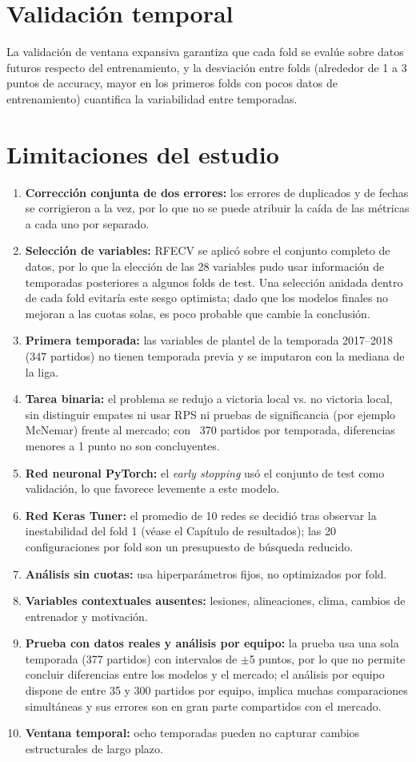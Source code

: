 \documentclass[12pt,letterpaper,oneside]{report}
\begin{document}
\section{Validación temporal}
La validación de ventana expansiva garantiza que cada fold se evalúe sobre datos futuros respecto del entrenamiento, y la desviación entre folds (alrededor de 1 a 3 puntos de accuracy, mayor en los primeros folds con pocos datos de entrenamiento) cuantifica la variabilidad entre temporadas.

\section{Limitaciones del estudio}
\begin{enumerate}
\item \textbf{Corrección conjunta de dos errores:} los errores de duplicados y de fechas se corrigieron a la vez, por lo que no se puede atribuir la caída de las métricas a cada uno por separado.
\item \textbf{Selección de variables:} RFECV se aplicó sobre el conjunto completo de datos, por lo que la elección de las 28 variables pudo usar información de temporadas posteriores a algunos folds de test. Una selección anidada dentro de cada fold evitaría este sesgo optimista; dado que los modelos finales no mejoran a las cuotas solas, es poco probable que cambie la conclusión.
\item \textbf{Primera temporada:} las variables de plantel de la temporada 2017--2018 (347 partidos) no tienen temporada previa y se imputaron con la mediana de la liga.
\item \textbf{Tarea binaria:} el problema se redujo a victoria local vs. no victoria local, sin distinguir empates ni usar RPS ni pruebas de significancia (por ejemplo McNemar) frente al mercado; con ~370 partidos por temporada, diferencias menores a 1 punto no son concluyentes.
\item \textbf{Red neuronal PyTorch:} el \textit{early stopping} usó el conjunto de test como validación, lo que favorece levemente a este modelo.
\item \textbf{Red Keras Tuner:} el promedio de 10 redes se decidió tras observar la inestabilidad del fold 1 (véase el Capítulo de resultados); las 20 configuraciones por fold son un presupuesto de búsqueda reducido.
\item \textbf{Análisis sin cuotas:} usa hiperparámetros fijos, no optimizados por fold.
\item \textbf{Variables contextuales ausentes:} lesiones, alineaciones, clima, cambios de entrenador y motivación.
\item \textbf{Prueba con datos reales y análisis por equipo:} la prueba usa una sola temporada (377 partidos) con intervalos de $\pm$5 puntos, por lo que no permite concluir diferencias entre los modelos y el mercado; el análisis por equipo dispone de entre 35 y 300 partidos por equipo, implica muchas comparaciones simultáneas y sus errores son en gran parte compartidos con el mercado.
\item \textbf{Ventana temporal:} ocho temporadas pueden no capturar cambios estructurales de largo plazo.
\end{enumerate}
\end{document}
